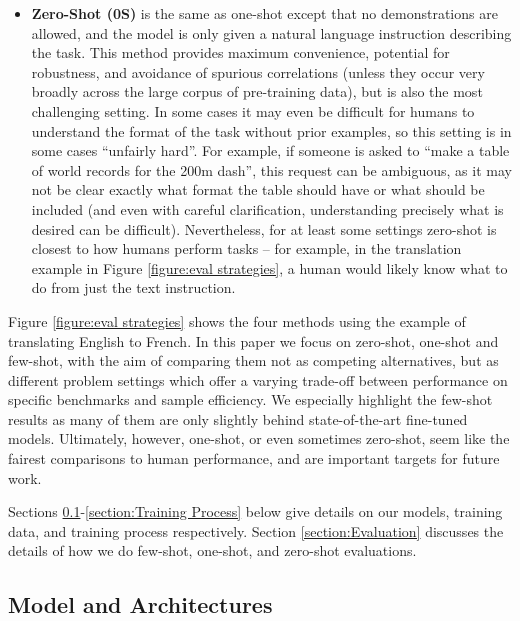 \begin{itemize}
    \item \textbf{Zero-Shot (0S)} is the same as one-shot except that no demonstrations are allowed, and the model is only given a natural language instruction describing the task.  This method provides maximum convenience, potential for robustness, and avoidance of spurious correlations (unless they occur very broadly across the large corpus of  pre-training data), but is also the most challenging setting.  In some cases it may even be difficult for humans to understand the format of the task without prior examples, so this setting is in some cases ``unfairly hard''.  For example, if someone is asked to ``make a table of world records for the 200m dash'', this request can be ambiguous, as it may not be clear exactly what format the table should have or what should be included (and even with careful clarification, understanding precisely what is desired can be difficult).  Nevertheless, for at least some settings zero-shot is closest to how humans perform tasks -- for example, in the translation example in Figure \ref{figure:eval strategies}, a human would likely know what to do from just the text instruction.
\end{itemize}

Figure \ref{figure:eval strategies} shows the four methods using the example of translating English to French.  In this paper we focus on zero-shot, one-shot and few-shot, with the aim of comparing them not as competing alternatives, but as different problem settings which offer a varying trade-off between performance on specific benchmarks and sample efficiency.  We especially highlight the few-shot results as many of them are only slightly behind state-of-the-art fine-tuned models.  Ultimately, however, one-shot, or even sometimes zero-shot, seem like the fairest comparisons to human performance, and are important targets for future work.

Sections \ref{section:Model and Architectures}-\ref{section:Training Process} below give details on our models, training data, and training process respectively. Section \ref{section:Evaluation} discusses the details of how we do few-shot, one-shot, and zero-shot evaluations.

    \subsection{Model and Architectures}
    \label{section:Model and Architectures}


